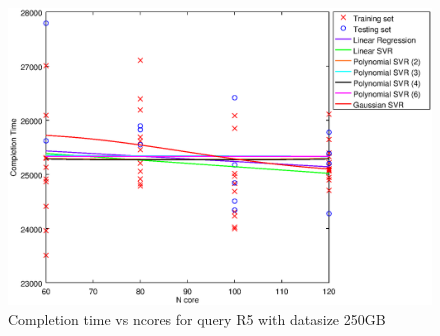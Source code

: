 
\begin {figure}[hbtp]
\centering
\includegraphics[width=\textwidth]{output/R5_250_LINEAR_NCORE/plot_R5_250.eps}
\caption{Completion time vs ncores for query R5 with datasize 250GB}
\label{fig:coreonly_linear_R5_250}
\end {figure}
